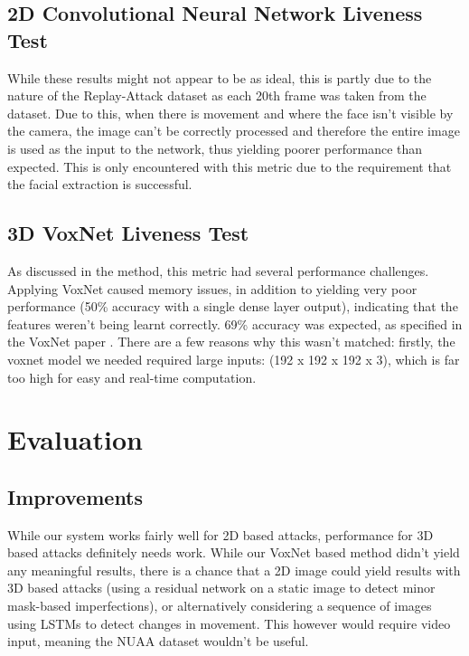 \documentclass[10pt,a4paper]{article}
\begin{document}


    \subsection{2D Convolutional Neural Network Liveness Test}
        \todo{}

        While these results might not appear to be as ideal, this is partly due to the nature of the Replay-Attack dataset as each 20th frame was taken from the dataset.
        Due to this, when there is movement and where the face isn't visible by the camera, the image can't be correctly processed and therefore the entire image is used
        as the input to the network, thus yielding poorer performance than expected. This is only encountered with this metric due to the requirement that the facial extraction is successful. 
        
    \subsection{3D VoxNet Liveness Test}
            As discussed in the method, this metric had several performance challenges. Applying VoxNet caused memory issues, in addition to yielding very poor performance
            (50\% accuracy with a single dense layer output), indicating that the features weren't being learnt correctly. 69\% accuracy was expected, as specified in the
            VoxNet paper \cite{VoxNetModel}. There are a few reasons why this wasn't matched: firstly, the voxnet model we needed required large inputs: (192 x 192 x 192 x 3),
            which is far too high for easy and real-time computation. 

\section{Evaluation}
    \subsection{Improvements}
    While our system works fairly well for 2D based attacks, performance for 3D based attacks definitely needs work.
    While our VoxNet based method didn't yield any meaningful results, there is a chance that a 2D image could yield results
    with 3D based attacks (using a residual network on a static image to detect minor mask-based imperfections), or alternatively
    considering a sequence of images using LSTMs to detect changes in movement. This however would require video input, meaning the
    NUAA dataset wouldn't be useful.
\end{document}
